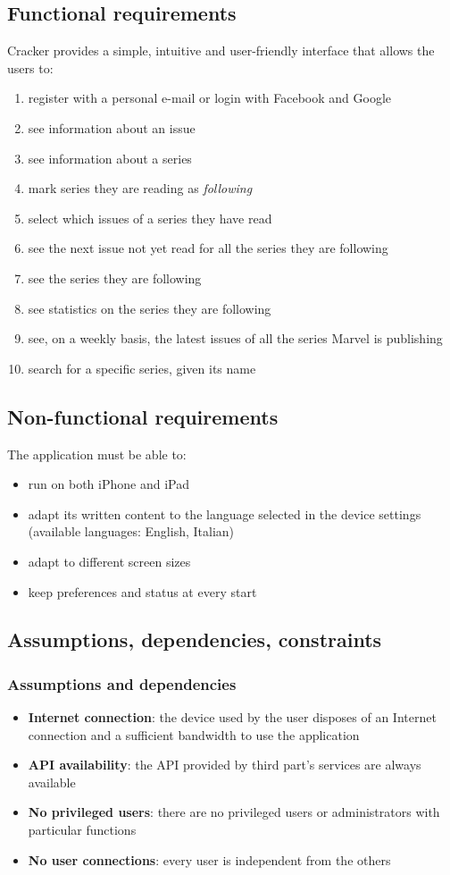\subsection{Functional requirements}
Cracker provides a simple, intuitive and user-friendly interface that allows the users to:
\begin{enumerate}
\item register with a personal e-mail or login with Facebook and Google
\item see information about an issue
\item see information about a series
\item mark series they are reading as {\slshape{following}}
\item select which issues of a series they have read
\item see the next issue not yet read for all the series they are following
\item see the series they are following
\item see statistics on the series they are following
\item see, on a weekly basis, the latest issues of all the series Marvel is publishing
\item search for a specific series, given its name
\end{enumerate}


\subsection{Non-functional requirements}
The application must be able to:
\begin{itemize}
\item run on both iPhone and iPad
\item adapt its written content to the language selected in the device settings (available languages: English, Italian)
\item adapt to different screen sizes
\item keep preferences and status at every start
\end{itemize}


\subsection{Assumptions, dependencies, constraints}
\subsubsection{Assumptions and dependencies}
\begin{itemize}
\item {\textbf{Internet connection}}: the device used by the user disposes of an Internet connection and a sufficient bandwidth to use the application
\item {\textbf{API availability}}: the API provided by third part's services are always available
\item{\textbf{No privileged users}}: there are no privileged users or administrators with particular functions
\item{\textbf{No user connections}}: every user is independent from the others
\end{itemize}

